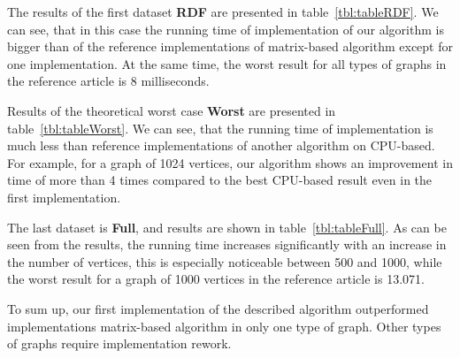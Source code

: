 The results of the first dataset \textbf{RDF} are presented in table~\ref{tbl:tableRDF}. We can see, that in this case the running time of implementation of our algorithm is bigger than of the reference implementations of matrix-based algorithm except for one implementation. At the same time, the worst result for all types of graphs in the reference article is 8 milliseconds.

Results of the theoretical worst case \textbf{Worst} are presented in table~\ref{tbl:tableWorst}. We can see, that the running time of implementation is much less than reference implementations of another algorithm on CPU-based. For example, for a graph of 1024 vertices, our algorithm shows an improvement in time of more than 4 times compared to the best CPU-based result even in the first implementation.

The last dataset is \textbf{Full}, and results are shown in table~\ref{tbl:tableFull}. As can be seen from the results, the running time increases significantly with an increase in the number of vertices, this is especially noticeable between 500 and 1000, while the worst result for a graph of 1000 vertices in the reference article is 13.071.

To sum up, our first implementation of the described algorithm outperformed implementations matrix-based algorithm in only one type of graph. Other types of graphs require implementation rework.
